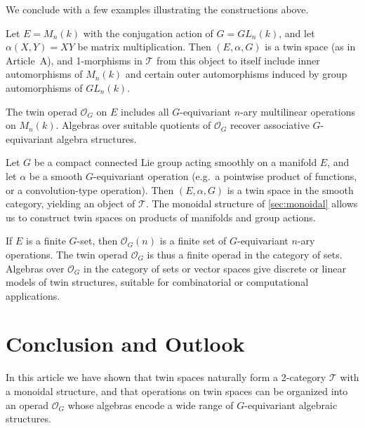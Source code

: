\documentclass[11pt,a4paper]{article}
\numberwithin{equation}{section}
\newcommand{\Twin}{\mathcal{T}}
\begin{document}
	We conclude with a few examples illustrating the constructions above.
	
	\begin{example}
		Let $E=M_n(k)$ with the conjugation action of $G=GL_n(k)$, and let $\alpha(X,Y)=XY$ be matrix multiplication.
		Then $(E,\alpha,G)$ is a twin space (as in Article~A), and 1-morphisms in $\Twin$ from this object to itself
		include inner automorphisms of $M_n(k)$ and certain outer automorphisms induced by group automorphisms of $GL_n(k)$.
		
		The twin operad $\mathcal{O}_G$ on $E$ includes all $G$-equivariant $n$-ary multilinear operations on $M_n(k)$.
		Algebras over suitable quotients of $\mathcal{O}_G$ recover associative $G$-equivariant algebra structures.
	\end{example}
	
	\begin{example}
		Let $G$ be a compact connected Lie group acting smoothly on a manifold $E$, and let $\alpha$ be a smooth
		$G$-equivariant operation (e.g.\ a pointwise product of functions, or a convolution-type operation).
		Then $(E,\alpha,G)$ is a twin space in the smooth category, yielding an object of $\Twin$.
		The monoidal structure of \cref{sec:monoidal} allows us to construct twin spaces on products
		of manifolds and group actions.
	\end{example}
	
	\begin{example}
		If $E$ is a finite $G$-set, then $\mathcal{O}_G(n)$ is a finite set of $G$-equivariant $n$-ary operations.
		The twin operad $\mathcal{O}_G$ is thus a finite operad in the category of sets.
		Algebras over $\mathcal{O}_G$ in the category of sets or vector spaces give discrete or linear models of
		twin structures, suitable for combinatorial or computational applications.
	\end{example}
	
	\section{Conclusion and Outlook}
	\label{sec:conclusion}
	
	In this article we have shown that twin spaces naturally form a 2-category $\Twin$ with a monoidal structure,
	and that operations on twin spaces can be organized into an operad $\mathcal{O}_G$ whose algebras encode
	a wide range of $G$-equivariant algebraic structures.
	
\end{document}

